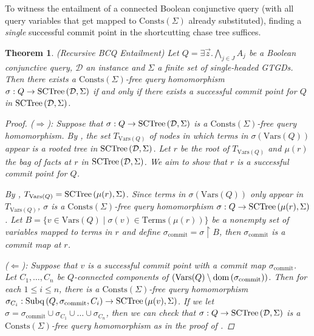 \documentclass[12pt]{report}
\theoremstyle{plain}
\newtheorem{theorem}{Theorem}[chapter]
\theoremstyle{definition}
\def\Vars{{\mathrm{Vars}}}
\def\Consts{{\mathrm{Consts}}}
\def\Terms{{\mathrm{Terms}}}
\newcommand{\dom}[1]{\ensuremath{\normalfont{\operatorname{dom}} \left( #1 \right)}}
\newcommand{\SCTree}[2]{\ensuremath{\normalfont{\textrm{SCTree}} \left( #1, #2 \right)}}
\newcommand{\Subq}[3]{\ensuremath{\normalfont{\textrm{Subq}} \left( #1, #2, #3 \right)}}
\begin{document}
To witness the entailment of a connected Boolean conjunctive query (with all query variables that get mapped to $\Consts(\Sigma)$ already substituted), finding a \emph{single} successful commit point in the shortcutting chase tree suffices.

\begin{theorem}(Recursive BCQ Entailment)
\label{recursive-connected-bcq-entailment}
  Let $Q = \exists \vec{z}. \bigwedge_{j \in J} A_j$ be a Boolean conjunctive query, $\mathcal{D}$ an instance and $\Sigma$ a finite set of single-headed GTGDs. Then there exists a $\Consts(\Sigma)$-free query homomorphism $\sigma: Q \rightarrow \SCTree{\mathcal{D}}{\Sigma}$ if and only if there exists a successful commit point for $Q$ in $\SCTree{\mathcal{D}}{\Sigma}$.
  \begin{proof}
    ($\Longrightarrow$): Suppose that $\sigma: Q \rightarrow \SCTree{\mathcal{D}}{\Sigma}$ is a $\Consts(\Sigma)$-free query homomorphism. By , the set $T_{\Vars(Q)}$ of nodes in which terms in $\sigma(\Vars(Q))$ appear is a rooted tree in $\SCTree{\mathcal{D}}{\Sigma}$. Let $r$ be the root of $T_{\Vars(Q)}$ and $\mu(r)$ the bag of facts at $r$ in $\SCTree{\mathcal{D}}{\Sigma}$. We aim to show that $r$ is a successful commit point for $Q$.

    By , $T_{\Vars(Q)} = \SCTree{\mu(r)}{\Sigma}$. Since terms in $\sigma(\Vars(Q))$ only appear in $T_{\Vars(Q)}$, $\sigma$ is a $\Consts(\Sigma)$-free query homomorphism $\sigma: Q \rightarrow \SCTree{\mu(r)}{\Sigma}$. Let $B = \{ v \in \Vars(Q) \mid \sigma(v) \in \Terms(\mu(r)) \}$ be a nonempty set of variables mapped to terms in $r$ and define $\sigma_\mathrm{commit} = \sigma \upharpoonright B$, then $\sigma_\mathrm{commit}$ is a commit map at $r$.

    ($\Longleftarrow$): Suppose that $v$ is a successful commit point with a commit map $\sigma_\mathrm{commit}$. Let $C_1, \ldots, C_n$ be $Q$-connected components of $(\Vars(Q) \setminus \dom{\sigma_\mathrm{commit}})$. Then for each $1 \leq i \leq n$, there is a $\Consts(\Sigma)$-free query homomorphism $\sigma_{C_i}: \Subq{Q}{\sigma_\mathrm{commit}}{C_i} \rightarrow \SCTree{\mu(v)}{\Sigma}$. If we let $\sigma = \sigma_\mathrm{commit} \cup \sigma_{C_1} \cup \ldots \cup \sigma_{C_n}$, then we can check that $\sigma: Q \rightarrow \SCTree{\mathcal{D}}{\Sigma}$ is a $\Consts(\Sigma)$-free query homomorphism as in the proof of .
  \end{proof}
\end{theorem}
\end{document}
